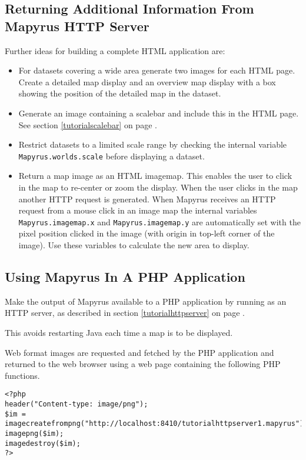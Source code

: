 \subsection{Returning Additional Information From Mapyrus HTTP Server}

Further ideas for building a complete HTML application are:

\begin{itemize}
\item
For datasets covering a wide area generate two images for
each HTML page.  Create a detailed map display and an overview map display
with a box showing the position of the detailed map in the dataset.

\item
Generate an image containing a scalebar
and include this in the HTML page.  See section \ref{tutorialscalebar}
on page \pageref{tutorialscalebar}.

\item
Restrict datasets to a limited scale range by checking the
internal variable
\texttt{Mapyrus.worlds.scale} before displaying a dataset.

\item
Return a map image as an HTML imagemap.  This enables the user to click
in the map to re-center or zoom the display.  When the user clicks
in the map another HTTP request is generated.  When Mapyrus receives
an HTTP request from a mouse click in an image map the internal variables
\texttt{Mapyrus.imagemap.x} and
\texttt{Mapyrus.imagemap.y} are automatically set with the pixel position
clicked in the image (with origin in top-left corner of the image).
Use these variables to calculate the new area to display.
\end{itemize}

\subsection{Using Mapyrus In A PHP Application}

Make the output of Mapyrus available to a PHP application by running as an
HTTP server, as described in section \ref{tutorialhttpserver}
on page \pageref{tutorialhttpserver}.

This avoids restarting Java each time a map is to be displayed.

Web format images are requested and fetched by the PHP
application and returned to the web browser using a
web page containing the following PHP functions.

\begin{verbatim}
<?php
header("Content-type: image/png");
$im = imagecreatefrompng("http://localhost:8410/tutorialhttpserver1.mapyrus");
imagepng($im);
imagedestroy($im);
?>
\end{verbatim}

